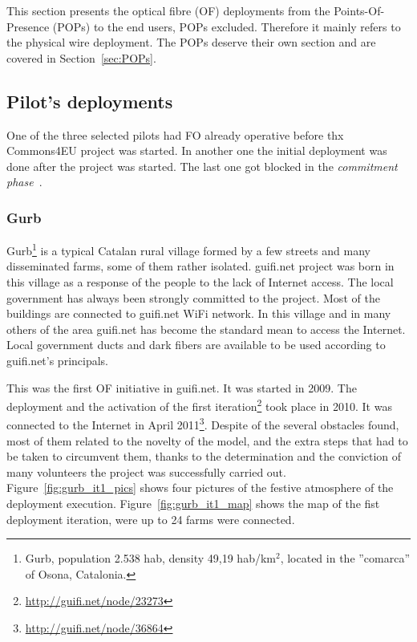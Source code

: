 This section presents the optical fibre (OF) deployments from the Points-Of-Presence (POPs) to the end users, POPs excluded. Therefore it mainly refers to the physical wire deployment. The POPs deserve their own section and are covered in Section~\ref{sec:POPs}.


\subsection{Pilot's deployments}

One of the three selected pilots had FO already operative before thx Commons4EU project was started. In another one the initial deployment was done after the project was started. The last one got blocked in the \emph{commitment phase}~\cite{barcelo2012bub}.

\subsubsection{Gurb}

Gurb\footnote{Gurb, population 2.538 hab, density 49,19 hab/km$^{2}$, located in the ''comarca'' of Osona, Catalonia.} is a typical Catalan rural village formed by a few streets and many disseminated farms, some of them rather isolated. guifi.net project was born in this village as a response of the people to the lack of Internet access. The local government has always been strongly committed to the project. Most of the buildings are connected to guifi.net WiFi network. In this village and in many others of the area guifi.net has become the standard mean to access the Internet. Local government ducts and dark fibers are available to be used according to guifi.net's principals.

This was the first OF initiative in guifi.net. It was started in 2009. The deployment and the activation of the first iteration\footnote{\url{http://guifi.net/node/23273}} took place in 2010. It was connected to the Internet in April 2011\footnote{\url{http://guifi.net/node/36864}}. Despite of the several obstacles found, most of them related to the novelty of the model, and the extra steps that had to be taken to circumvent them, thanks to the determination and the conviction of many volunteers the project was successfully carried out. Figure~\ref{fig:gurb_it1_pics} shows four pictures of the festive atmosphere of the deployment execution. Figure~\ref{fig:gurb_it1_map} shows the map of the fist deployment iteration, were up to 24 farms were connected. 

